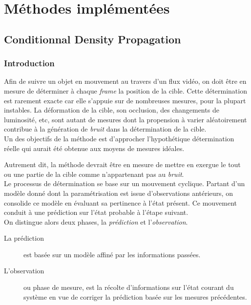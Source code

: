 \documentclass[a4paper,12pt]{report}
\begin{document}
\pagebreak
\chapter{Méthodes implémentées}

\section{Conditionnal Density Propagation}
\subsection{Introduction}
Afin de suivre un objet en mouvement au travers d'un flux vidéo, on doit être en mesure de déterminer à chaque \textit{frame} la position de la cible. 
Cette détermination est rarement exacte car elle s'appuie sur de nombreuses mesures, pour la plupart instables. 
La déformation de la cible, son occlusion, des changements de luminosité, etc, sont autant de mesures dont la propension à varier aléatoirement contribue à la génération de \emph{bruit} dans la détermination de la cible.\\

Un des objectifs de la méthode est d'approcher l'hypothétique détermination réelle qui aurait été obtenue aux moyens de mesures idéales. 

Autrement dit, la méthode devrait être en mesure de mettre en exergue le tout ou une partie de la cible comme n'appartenant pas au \emph{bruit}.\\

Le processus de détermination se base sur un mouvement cyclique. Partant d'un modèle donné dont la paramétrisation est issue d'observations antérieurs, on consolide ce modèle en évaluant sa pertinence à l'état présent. Ce mouvement conduit à une prédiction sur l'état probable à l'étape suivant.\\ 
On distingue alors deux phases, la \textit{prédiction} et l'\textit{observation}. 
\begin{description}
\item [La prédiction] est basée sur un modèle affiné par les informations passées.
\item [L'observation] ou phase de mesure, est la récolte d'informations sur l'état courant du système en vue de corriger la prédiction basée sur les mesures précédentes.\\
\end{description}
 
\end{document}
